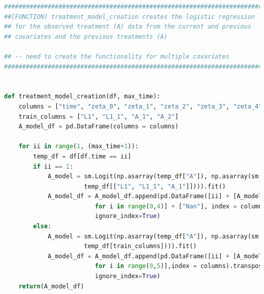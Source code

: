 \begin{lstlisting}[language=Python]
#########################################################################
##[FUNCTION] treatment_model_creation creates the logistic regression 
## for the observed treatment (A) data from the current and previous 
## covariates and the previous treatments (A) 

## -- need to create the functionality for multiple covariates
#########################################################################


def treatment_model_creation(df, max_time): 
    columns = ["time", "zeta_0", "zeta_1", "zeta_2", "zeta_3", "zeta_4"]
    train_columns = ["L1", "L1_1", "A_1", "A_2"]
    A_model_df = pd.DataFrame(columns = columns)

    for ii in range(1, (max_time+1)): 
        temp_df = df[df.time == ii]   
        if ii == 1: 
            A_model = sm.Logit(np.asarray(temp_df["A"]), np.asarray(sm.add_constant(\
                      temp_df[["L1", "L1_1", "A_1"]]))).fit()
            A_model_df = A_model_df.append(pd.DataFrame([ii] + [A_model.params[i] \
                         for i in range(0,4)] + ["Nan"], index = columns).transpose(),\
                         ignore_index=True)
        else: 
            A_model = sm.Logit(np.asarray(temp_df["A"]), np.asarray(sm.add_constant(\
                      temp_df[train_columns]))).fit()
            A_model_df = A_model_df.append(pd.DataFrame([ii] + [A_model.params[i] \
                         for i in range(0,5)],index = columns).transpose(), \
                         ignore_index=True)
    return(A_model_df)
\end{lstlisting}

